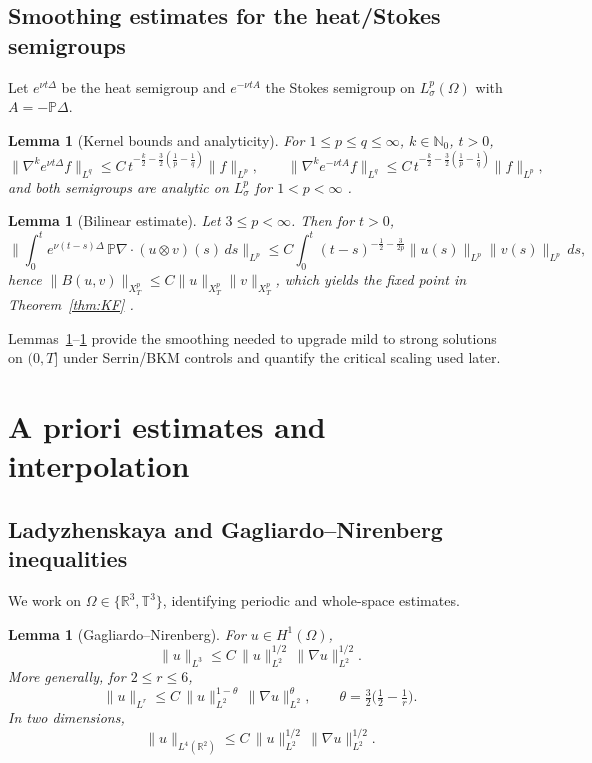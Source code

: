 \IfFileExists{nyjm.cls}{\documentclass[11pt]{nyjm}}{\documentclass[11pt]{amsart}}
\newcommand{\R}{\mathbb{R}}
\newcommand{\T}{\mathbb{T}}
\theoremstyle{plain}
\newtheorem{lemma}[theorem]{Lemma}
\theoremstyle{definition}
\theoremstyle{remark}
\begin{document}
\subsection{Smoothing estimates for the heat/Stokes semigroups}\label{subsec:stokes}
Let $e^{\nu t\Delta}$ be the heat semigroup and $e^{-\nu tA}$ the Stokes semigroup on $L^p_\sigma(\Omega)$ with $A=-\mathbb P\Delta$.

\begin{lemma}[Kernel bounds and analyticity]\label{lem:heat-stokes}
For $1\le p\le q\le\infty$, $k\in\mathbb N_0$, $t>0$,
\[
\|\nabla^k e^{\nu t\Delta}f\|_{L^q}\le C\, t^{-\frac{k}{2}-\frac{3}{2}\left(\frac1p-\frac1q\right)}\|f\|_{L^p},\qquad
\|\nabla^k e^{-\nu tA}f\|_{L^q}\le C\, t^{-\frac{k}{2}-\frac{3}{2}\left(\frac1p-\frac1q\right)}\|f\|_{L^p},
\]
and both semigroups are analytic on $L^p_\sigma$ for $1<p<\infty$ \cite{Giga1986,Sohr2001}.
\end{lemma}

\begin{lemma}[Bilinear estimate]\label{lem:bilinear}
Let $3\le p<\infty$. Then for $t>0$,
\[
\Big\|\int_0^t e^{\nu(t-s)\Delta}\,\mathbb P\nabla\!\cdot(u\otimes v)(s)\,ds\Big\|_{L^p}
\le C \int_0^t (t-s)^{-\frac12-\frac{3}{2p}} \|u(s)\|_{L^p}\|v(s)\|_{L^p}\,ds,
\]
hence $\|B(u,v)\|_{X_T^{p}}\le C\|u\|_{X_T^{p}}\|v\|_{X_T^{p}}$, which yields the fixed point in Theorem~\ref{thm:KF} \cite{Kato1984,Cannone1995,Lemarie2002}.
\end{lemma}

\medskip
Lemmas~\ref{lem:heat-stokes}--\ref{lem:bilinear} provide the smoothing needed to upgrade mild to strong solutions on $(0,T]$ under Serrin/BKM controls and quantify the critical scaling used later.


\section{A priori estimates and interpolation}\label{sec:apriori}

\subsection{Ladyzhenskaya and Gagliardo--Nirenberg inequalities}\label{subsec:GN}
We work on $\Omega\in\{\R^3,\T^3\}$, identifying periodic and whole-space estimates.

\begin{lemma}[Gagliardo--Nirenberg]\label{lem:GN}
For $u\in H^1(\Omega)$,
\begin{equation}\label{eq:GN-L3}
\|u\|_{L^3}\le C\,\|u\|_{L^2}^{1/2}\,\|\nabla u\|_{L^2}^{1/2}.
\end{equation}
More generally, for $2\le r\le 6$,
\begin{equation}\label{eq:GN-general}
\|u\|_{L^r}\le C\,\|u\|_{L^2}^{1-\theta}\,\|\nabla u\|_{L^2}^{\theta},
\qquad \theta=\tfrac{3}{2}\Big(\tfrac12-\tfrac1r\Big).
\end{equation}
In two dimensions,
\begin{equation}\label{eq:Ladyzhenskaya}
\|u\|_{L^4(\R^2)}\le C\,\|u\|_{L^2}^{1/2}\,\|\nabla u\|_{L^2}^{1/2}.
\end{equation}
\end{lemma}
\end{document}
